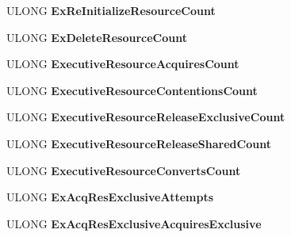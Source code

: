 \begin{DoxyCompactItemize}
\item 
\mbox{\label{struct___s_y_n_c_h___c_o_u_n_t_e_r_s_acb444eef27ee56e33feb775f8049f574}} 
U\+L\+O\+NG {\bfseries Ex\+Re\+Initialize\+Resource\+Count}
\item 
\mbox{\label{struct___s_y_n_c_h___c_o_u_n_t_e_r_s_a71e197c5c54d2437832b93b8d16a715e}} 
U\+L\+O\+NG {\bfseries Ex\+Delete\+Resource\+Count}
\item 
\mbox{\label{struct___s_y_n_c_h___c_o_u_n_t_e_r_s_ad05646bb0c1ca03568dd5d60e99971f4}} 
U\+L\+O\+NG {\bfseries Executive\+Resource\+Acquires\+Count}
\item 
\mbox{\label{struct___s_y_n_c_h___c_o_u_n_t_e_r_s_a773814de0a19426703eb5c77c4488e91}} 
U\+L\+O\+NG {\bfseries Executive\+Resource\+Contentions\+Count}
\item 
\mbox{\label{struct___s_y_n_c_h___c_o_u_n_t_e_r_s_a492593269e2507dec16ccc9bb1868c09}} 
U\+L\+O\+NG {\bfseries Executive\+Resource\+Release\+Exclusive\+Count}
\item 
\mbox{\label{struct___s_y_n_c_h___c_o_u_n_t_e_r_s_a284505cf5944141bd19ffe18dee25bd6}} 
U\+L\+O\+NG {\bfseries Executive\+Resource\+Release\+Shared\+Count}
\item 
\mbox{\label{struct___s_y_n_c_h___c_o_u_n_t_e_r_s_a432b411e438075860d8f8ddd5b343072}} 
U\+L\+O\+NG {\bfseries Executive\+Resource\+Converts\+Count}
\item 
\mbox{\label{struct___s_y_n_c_h___c_o_u_n_t_e_r_s_ad37eb8e87c3593419ba9f784fe7c1744}} 
U\+L\+O\+NG {\bfseries Ex\+Acq\+Res\+Exclusive\+Attempts}
\item 
\mbox{\label{struct___s_y_n_c_h___c_o_u_n_t_e_r_s_adbdf9332777adff6bd473081ac2e7bc4}} 
U\+L\+O\+NG {\bfseries Ex\+Acq\+Res\+Exclusive\+Acquires\+Exclusive}
\item 
\mbox{\label{struct___s_y_n_c_h___c_o_u_n_t_e_r_s_a3faafe970b7502df85db2691d165620b}} 

\end{DoxyCompactItemize}
